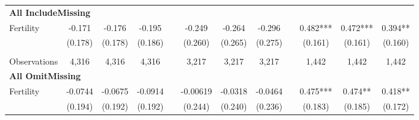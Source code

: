 \begin{landscape}
\begin{table}[htpb!]
\begin{center}
\begin{tabular}{lcccp{2mm}cccp{2mm}ccc}
\multicolumn{12}{l}{\textbf{All IncludeMissing}}\\ 
Fertility&-0.171&-0.176&-0.195&&-0.249&-0.264&-0.296&&0.482***&0.472***&0.394**\\
&(0.178)&(0.178)&(0.186)&&(0.260)&(0.265)&(0.275)&&(0.161)&(0.161)&(0.160)\\
\begin{footnotesize}\end{footnotesize}&\begin{footnotesize}\end{footnotesize}&\begin{footnotesize}\end{footnotesize}&\begin{footnotesize}\end{footnotesize}&\begin{footnotesize}\end{footnotesize}&\begin{footnotesize}\end{footnotesize}&\begin{footnotesize}\end{footnotesize}&\begin{footnotesize}\end{footnotesize}&\begin{footnotesize}\end{footnotesize}&\begin{footnotesize}\end{footnotesize}&\begin{footnotesize}\end{footnotesize}&\begin{footnotesize}\end{footnotesize}\\Observations&4,316&4,316&4,316&&3,217&3,217&3,217&&1,442&1,442&1,442\\
\multicolumn{12}{l}{\textbf{All OmitMissing}}\\ 
Fertility&-0.0744&-0.0675&-0.0914&&-0.00619&-0.0318&-0.0464&&0.475***&0.474**&0.418**\\
&(0.194)&(0.192)&(0.192)&&(0.244)&(0.240)&(0.236)&&(0.183)&(0.185)&(0.172)\\

\end{tabular}
\end{center}
\end{table}
\end{landscape}

